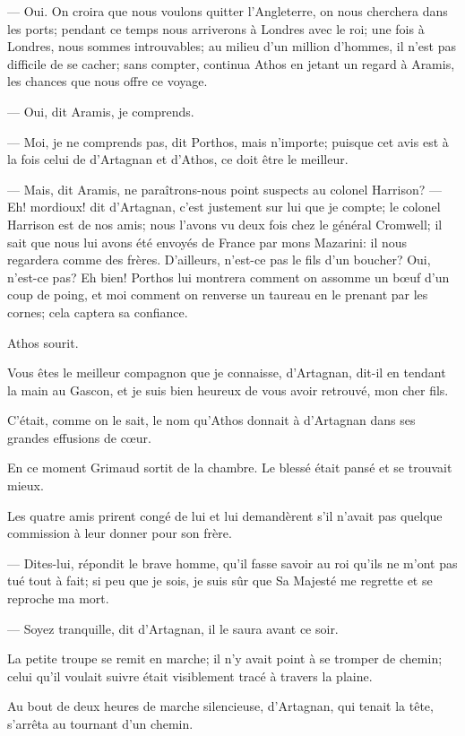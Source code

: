 — Oui. On croira que nous voulons quitter l'Angleterre, on nous cherchera dans les ports; pendant ce temps nous arriverons à Londres avec le roi; une fois à Londres, nous sommes introuvables; au milieu d'un million d'hommes, il n'est pas difficile de se cacher; sans compter, continua Athos en jetant un regard à Aramis, les chances que nous offre ce voyage.

— Oui, dit Aramis, je comprends.

— Moi, je ne comprends pas, dit Porthos, mais n'importe; puisque cet avis est à la fois celui de d'Artagnan et d'Athos, ce doit être le meilleur.

— Mais, dit Aramis, ne paraîtrons-nous point suspects au colonel Harrison?
— Eh! mordioux! dit d'Artagnan, c'est justement sur lui que je compte; le colonel Harrison est de nos amis; nous l'avons vu deux fois chez le général Cromwell; il sait que nous lui avons été envoyés de France par mons Mazarini: il nous regardera comme des frères. D'ailleurs, n'est-ce pas le fils d'un boucher? Oui, n'est-ce pas? Eh bien! Porthos lui montrera comment on assomme un bœuf d'un coup de poing, et moi comment on renverse un taureau en le prenant par les cornes; cela captera sa confiance.

Athos sourit.

Vous êtes le meilleur compagnon que je connaisse, d'Artagnan, dit-il en tendant la main au Gascon, et je suis bien heureux de vous avoir retrouvé, mon cher fils.

C'était, comme on le sait, le nom qu'Athos donnait à d'Artagnan dans ses grandes effusions de cœur.

En ce moment Grimaud sortit de la chambre. Le blessé était pansé et se trouvait mieux.

Les quatre amis prirent congé de lui et lui demandèrent s'il n'avait pas quelque commission à leur donner pour son frère.

— Dites-lui, répondit le brave homme, qu'il fasse savoir au roi qu'ils ne m'ont pas tué tout à fait; si peu que je sois, je suis sûr que Sa Majesté me regrette et se reproche ma mort.

— Soyez tranquille, dit d'Artagnan, il le saura avant ce soir.

La petite troupe se remit en marche; il n'y avait point à se tromper de chemin; celui qu'il voulait suivre était visiblement tracé à travers la plaine.

Au bout de deux heures de marche silencieuse, d'Artagnan, qui tenait la tête, s'arrêta au tournant d'un chemin.

